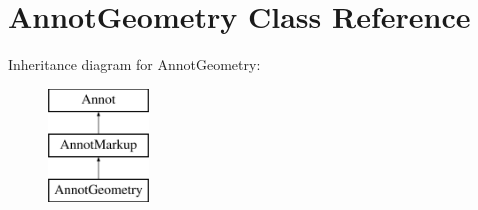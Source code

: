\hypertarget{class_annot_geometry}{}\section{Annot\+Geometry Class Reference}
\label{class_annot_geometry}
Inheritance diagram for Annot\+Geometry\+:\begin{figure}[H]
\begin{center}
\leavevmode
\includegraphics[height=3.000000cm]{class_annot_geometry}
\end{center}
\end{figure}
